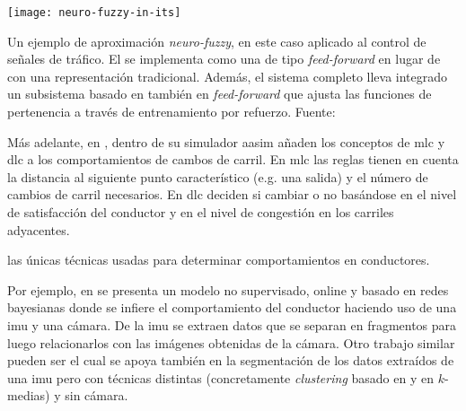 \begin{marginfigure}
	\texttt{[image: neuro-fuzzy-in-its]}
	\caption[Ejemplo de aproximación \textit{neuro-fuzzy} al control de señales de tráfico]{Un ejemplo de aproximación \textit{neuro-fuzzy}, en este caso aplicado al control de señales de tráfico. El  se implementa como una  de tipo \textit{feed-forward} en lugar de con una representación tradicional. Además, el sistema completo lleva integrado un subsistema basado en también en  \textit{feed-forward} que ajusta las funciones de pertenencia a través de entrenamiento por refuerzo. Fuente: \cite{bingham2001reinforcement}}
	\label{fig:neuro-fuzzy-in-its}
\end{marginfigure}

Más adelante, en \cite{Das2009}, dentro de su simulador \gls{aasim} añaden los conceptos de \Acrshort{mlc} y \Acrshort{dlc} a los comportamientos de cambos de carril. En \Acrshort{mlc} las reglas tienen en cuenta la distancia al siguiente punto característico (e.g. una salida) y el número de cambios de carril necesarios. En \Acrshort{dlc} deciden si cambiar o no basándose en el nivel de satisfacción del conductor y en el nivel de congestión en los carriles adyacentes.

 las únicas técnicas usadas para determinar comportamientos en conductores.

Por ejemplo, en \cite{maye2011bayesian} se presenta un modelo no supervisado, online y basado en redes bayesianas donde se infiere el comportamiento del conductor haciendo uso de una \gls{imu} y una cámara. De la \gls{imu} se extraen datos que se separan en fragmentos para luego relacionarlos con las imágenes obtenidas de la cámara. Otro trabajo similar pueden ser \cite{van2013driver} el cual se apoya también en la segmentación de los datos extraídos de una \gls{imu} pero con técnicas distintas (concretamente \textit{clustering} basado en  y en $k$-medias) y sin cámara.

